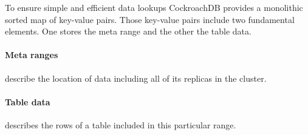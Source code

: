 \documentclass[12pt,a4paper]{article}
\begin{document}
To ensure simple and efficient data lookups CockroachDB provides a monolithic sorted map of key-value pairs. Those key-value
pairs include two fundamental elements. One stores the meta range and the other the table data.


\paragraph{Meta ranges}
describe the location of data including all of its replicas in the cluster.

\paragraph{Table data}
describes the rows of a table included in this particular range.
\end{document}
